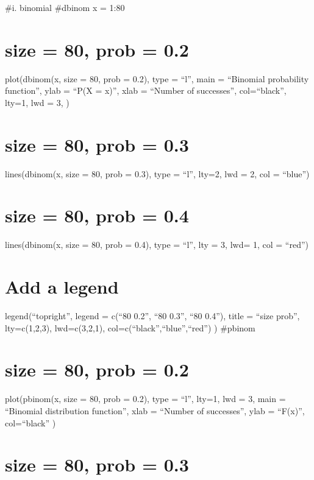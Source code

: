 \documentclass[
]{article}
\begin{document}
\#i. binomial \#dbinom x = 1:80

\hypertarget{size-80-prob-0.2}{%
\section{size = 80, prob = 0.2}\label{size-80-prob-0.2}}

plot(dbinom(x, size = 80, prob = 0.2), type = ``l'', main = ``Binomial
probability function'', ylab = ``P(X = x)'', xlab = ``Number of
successes'', col=``black'', lty=1, lwd = 3, )

\hypertarget{size-80-prob-0.3}{%
\section{size = 80, prob = 0.3}\label{size-80-prob-0.3}}

lines(dbinom(x, size = 80, prob = 0.3), type = ``l'', lty=2, lwd = 2,
col = ``blue'')

\hypertarget{size-80-prob-0.4}{%
\section{size = 80, prob = 0.4}\label{size-80-prob-0.4}}

lines(dbinom(x, size = 80, prob = 0.4), type = ``l'', lty = 3, lwd= 1,
col = ``red'')

\hypertarget{add-a-legend}{%
\section{Add a legend}\label{add-a-legend}}

legend(``topright'', legend = c(``80 0.2'', ``80 0.3'', ``80 0.4''),
title = ``size prob'', lty=c(1,2,3), lwd=c(3,2,1),
col=c(``black'',``blue'',``red'') ) \#pbinom

\hypertarget{size-80-prob-0.2-1}{%
\section{size = 80, prob = 0.2}\label{size-80-prob-0.2-1}}

plot(pbinom(x, size = 80, prob = 0.2), type = ``l'', lty=1, lwd = 3,
main = ``Binomial distribution function'', xlab = ``Number of
successes'', ylab = ``F(x)'', col=``black'' )

\hypertarget{size-80-prob-0.3-1}{%
\section{size = 80, prob = 0.3}\label{size-80-prob-0.3-1}}
\end{document}
